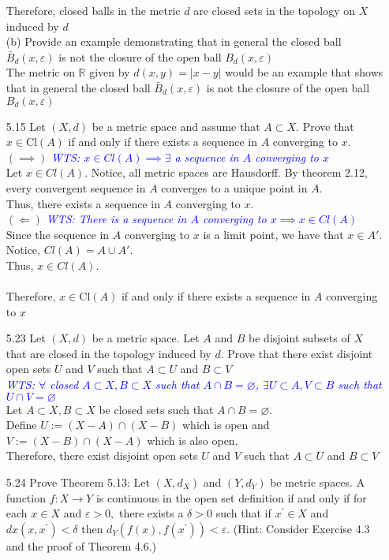 \documentclass[12pt]{article}
\newcommand{\R}{\mathbb{R}}
\newcommand{\wts}[1]{\textit{\textcolor{blue}{WTS: #1}}\\}
\newcommand{\1}{^{-1}}
\begin{document}
\begin{enumerate}
	Therefore, closed balls in the metric $d$ are closed sets in the topology on $X$ induced by $d$
	\\
	(b) Provide an example demonstrating that in general the closed ball $\bar{B}_{d}(x, \varepsilon)$ is not the closure of the open ball $B_{d}(x, \varepsilon)$\\
	The metric on $ \R $ given by $ d(x,y)=|x-y| $ would be an example that shows that in general the closed ball $\bar{B}_{d}(x, \varepsilon)$ is not the closure of the open ball $B_{d}(x, \varepsilon)$
	\item[5.15] Let $(X, d)$ be a metric space and assume that $A \subset X .$ Prove that $x \in \mathrm{Cl}(A)$ if and only if there exists a sequence in $A$ converging to $x$.\\
	$(\implies)$ \wts{$ x\in Cl(A)  \implies \exists$ a sequence in $ A $ converging to $ x $}
	Let $ x\in Cl(A) $. Notice, all metric spaces are Hausdorff. By theorem 2.12, every convergent sequence in $ A $ converges to a unique point in $ A $.\\
	Thus, there exists a sequence in $ A $ converging to $ x $.\\
	$(\Longleftarrow)$ \wts{There is a sequence in $ A $ converging to $ x \implies x\in Cl(A)$ }
	Since the sequence in $ A $ converging to $ x $ is a limit point, we have that $ x\in A' $. Notice, $ Cl(A)=A\cup A' $. \\
	Thus, $ x\in Cl(A) $.\\
	\\
	Therefore, $x \in \mathrm{Cl}(A)$ if and only if there exists a sequence in $A$ converging to $x$
	\item[5.23] Let $(X, d)$ be a metric space. Let $A$ and $B$ be disjoint subsets of $X$ that are closed in the topology induced by $d .$ Prove that there exist disjoint open sets $U$ and $V$ such that $A \subset U$ and $B \subset V$\\
	\wts{$\forall $ closed $ A\subset X, B \subset X$ such that $ A\cap B = \varnothing $, $ \exists U\subset A, V\subset B $ such that $ U\cap V = \varnothing $} 
	Let $ A\subset X, B\subset X $ be closed sets such that $ A\cap B = \varnothing $.\\
	Define $ U:= (X-A)\cap(X-B) $ which is open and $ V:=(X-B)\cap(X-A) $ which is also open. 
	\\
	Therefore, there exist disjoint open sets $U$ and $V$ such that $A \subset U$ and $B \subset V$
	\item[5.24] Prove Theorem 5.13: Let $\left(X, d_{X}\right)$ and $\left(Y, d_{Y}\right)$ be metric spaces. A function $f: X \rightarrow Y$ is continuous in the open set definition if and only if for each $x \in X$ and $\varepsilon>0,$ there exists a $\delta>0$ such that if $x^{\prime} \in X$ and $d x\left(x, x^{\prime}\right)<\delta$ then $d_{Y}\left(f(x), f\left(x^{\prime}\right)\right)<\varepsilon .$ (Hint: Consider Exercise 4.3 and the proof of Theorem 4.6.)\\

\end{enumerate}
\end{document}
